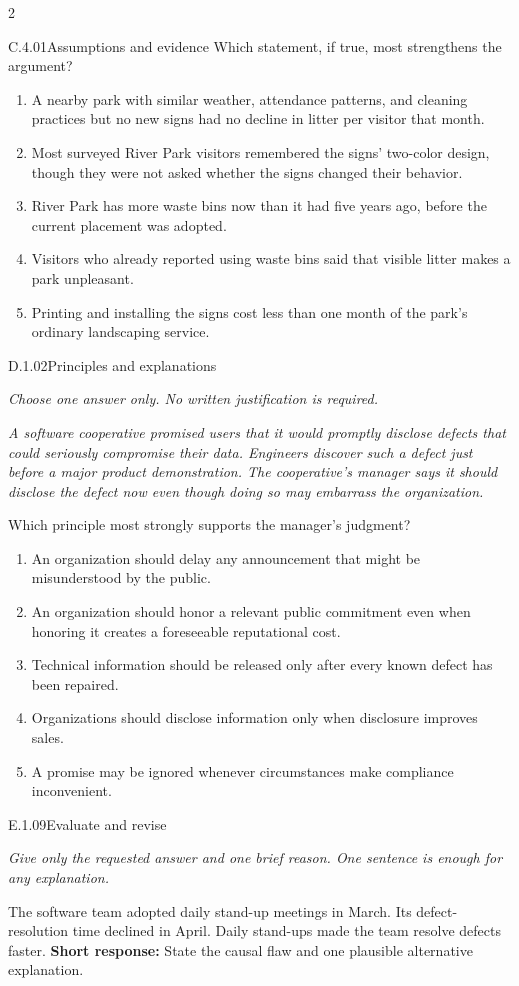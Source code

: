 \documentclass[9pt]{extarticle}
\newcommand{\choice}[1]{\item #1}
\begin{document}
\begin{multicols}{2}
\begin{DenseCoreProblem}{C.4.01}{Assumptions and evidence}
Which statement, if true, most strengthens the argument?
\begin{enumerate}[label=(\alph*)]
  \choice{A nearby park with similar weather, attendance patterns, and cleaning practices but no new signs had no decline in litter per visitor that month.}
  \choice{Most surveyed River Park visitors remembered the signs' two-color design, though they were not asked whether the signs changed their behavior.}
  \choice{River Park has more waste bins now than it had five years ago, before the current placement was adopted.}
  \choice{Visitors who already reported using waste bins said that visible litter makes a park unpleasant.}
  \choice{Printing and installing the signs cost less than one month of the park's ordinary landscaping service.}
\end{enumerate}
\end{DenseCoreProblem}
\begin{DenseCoreProblem}{D.1.02}{Principles and explanations}
{\scriptsize\textit{Choose one answer only. No written justification is required.}\par}
\emph{A software cooperative promised users that it would promptly disclose defects that could seriously compromise their data. Engineers discover such a defect just before a major product demonstration. The cooperative's manager says it should disclose the defect now even though doing so may embarrass the organization.}

Which principle most strongly supports the manager's judgment?
\begin{enumerate}[label=(\alph*)]
  \choice{An organization should delay any announcement that might be misunderstood by the public.}
  \choice{An organization should honor a relevant public commitment even when honoring it creates a foreseeable reputational cost.}
  \choice{Technical information should be released only after every known defect has been repaired.}
  \choice{Organizations should disclose information only when disclosure improves sales.}
  \choice{A promise may be ignored whenever circumstances make compliance inconvenient.}
\end{enumerate}
\end{DenseCoreProblem}
\begin{DenseCoreProblem}{E.1.09}{Evaluate and revise}
{\scriptsize\textit{Give only the requested answer and one brief reason. One sentence is enough for any explanation.}\par}
The software team adopted daily stand-up meetings in March. Its defect-resolution time declined in April. Daily stand-ups made the team resolve defects faster.
\textbf{Short response:} State the causal flaw and one plausible alternative explanation.
\end{DenseCoreProblem}
\end{multicols}
\end{document}
